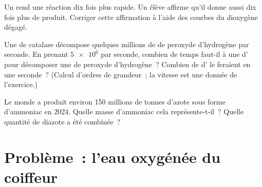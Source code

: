 \begin{exercise}[$\star\star\star$]\label{exo:g12:catalysis:13}
Un  rend une réaction dix fois plus rapide. Un élève affirme
qu'il donne aussi dix fois plus de produit. Corriger cette affirmation à
l'aide des courbes du dioxygène dégagé.
\end{exercise}

\begin{exercise}[$\star\star\star$]\label{exo:g12:catalysis:14}
Une  de catalase décompose quelques millions de  de
peroxyde d'hydrogène par seconde. En prenant $\num{5e6}$ par seconde,
combien de temps faut-il à une  d' pour décomposer une
 de peroxyde d'hydrogène~? Combien de  d' le feraient
en une seconde~? (Calcul d'ordres de grandeur~; la vitesse est une
donnée de l'exercice.)
\end{exercise}

\begin{exercise}[$\star\star\star$]\label{exo:g12:catalysis:15}
Le monde a produit environ 150 millions de tonnes d'azote sous forme
d'ammoniac en 2024. Quelle masse d'ammoniac cela représente-t-il~?
Quelle quantité de diazote a été combinée~?
\end{exercise}

\section{Problème~: l'eau oxygénée du coiffeur}


